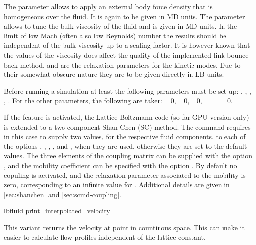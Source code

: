 The parameter  allows to apply an external body force
density that is homogeneous over the fluid. It is again to be given in
MD units.  The parameter  allows to tune the bulk
viscosity of the fluid and is given in MD units. In the limit of low
Mach (often also low Reynolds) number the results should be
independent of the bulk viscosity up to a scaling factor. 
It is however known that the values of the viscosity does 
affect the quality of the implemented link-bounce-back method.
 and
 are the relaxation parameters for the kinetic
modes. Due to their somewhat obscure nature they are to be given
directly in LB units.

Before running a simulation at least the following parameters must be
set up: , , , ,
. For the other parameters, the following are taken:
=0, =0, =0,
 =  =  = 0.

If the feature  is activated, the Lattice Boltzmann
code (so far GPU version only) is extended to a two-component
Shan-Chen (SC) method.  The  command requires in this case
to supply two values, for the respective fluid components, to each
of the options , , , ,
 and , when they are used, otherwise
they are set to the default values. The three elements of the
coupling matrix can be supplied with the option ,
and the mobility coefficient can be
specified with the option . By default no copuling is activated, and the relaxation parameter associated to the mobility is zero, corresponding to an infinite value for . Additional details are
given in \ref{sec:shanchen} and \ref{sec:scmd-coupling}.

\begin{essyntax}
  lbfluid print_interpolated_velocity   
\end{essyntax}
This variant returns the velocity at point in countinous space. 
This can make it easier to calculate flow profiles independent of
the lattice constant.

